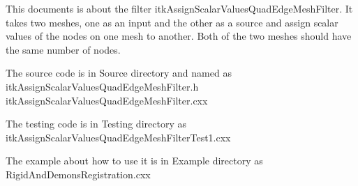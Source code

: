 This documents is about the filter itkAssignScalarValuesQuadEdgeMeshFilter.
It takes two meshes, one as an input and the other as a source and assign scalar values of the nodes on one mesh to another.
Both of the two meshes should have the same number of nodes.

The source code is in Source directory and named as 
itkAssignScalarValuesQuadEdgeMeshFilter.h
itkAssignScalarValuesQuadEdgeMeshFilter.cxx

The testing code is in Testing directory as
itkAssignScalarValuesQuadEdgeMeshFilterTest1.cxx

The example about how to use it is in Example directory as
RigidAndDemonsRegistration.cxx